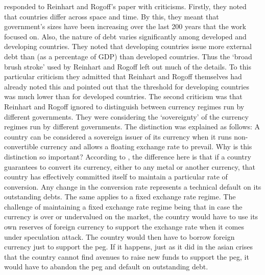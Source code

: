 \documentclass[12pt, a4paper]{article}
\begin{document}
	 responded to Reinhart and Rogoff's paper with criticisms. Firstly, they noted that countries differ across space and time. By this, they meant that government's sizes have been increasing over the last 200 years that the work focused on. Also, the nature of debt varies significantly among developed and developing countries. They noted that developing countries issue more external debt than (as a percentage of GDP) than developed countries. Thus the `broad brush stroke' used by Reinhart and Rogoff left out much of the details. To this particular criticism they admitted that Reinhart and Rogoff themselves had already noted this and pointed out that the threshold for developing countries was much lower than for developed countries. The second criticism was that Reinhart and Rogoff ignored to distinguish between currency regimes run by different governments. They were considering the `sovereignty' of the currency regimes run by different governments. The distinction was explained as follows: A country can be considered a sovereign issuer of its currency when it runs non-convertible currency and allows a floating exchange rate to prevail. Why is this distinction so important? According to , the difference here is that if a country guarantees to convert its currency, either to any metal or another currency, that country has effectively committed itself to maintain a particular rate of conversion. Any change in the conversion rate represents a technical default on its outstanding debts. The same applies to a fixed exchange rate regime. The challenge of maintaining a fixed exchange rate regime being that in case the currency is over or undervalued on the market, the country would have to use its own reserves of foreign currency to support the exchange rate when it comes under speculation attack. The country would then have to borrow foreign currency just to support the peg. If it happens, just as it did in the asian crises that the country cannot find avenues to raise new funds to support the peg, it would have to abandon the peg and default on outstanding debt. 
	
\end{document}
